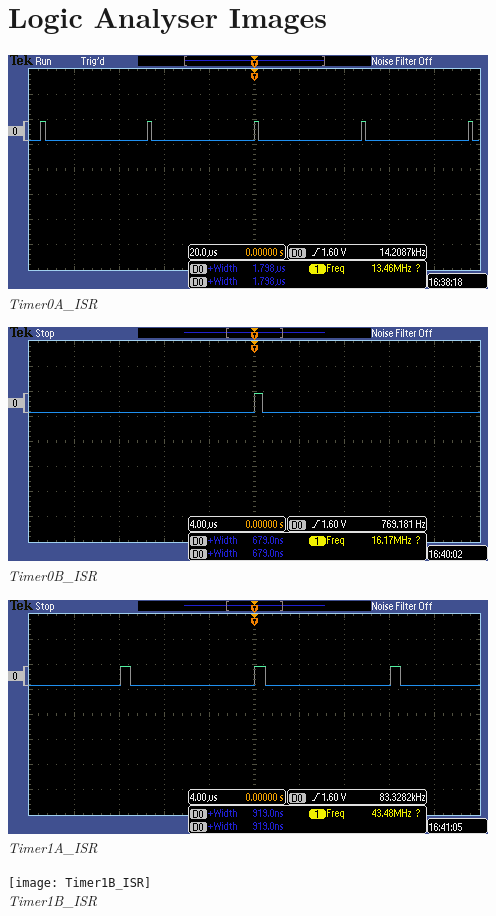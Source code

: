 \documentclass[twoside]{article}
\begin{document}
\section*{Logic Analyser Images}
\includegraphics[width=\textwidth]{Timer0A_ISR}\\
\emph{Timer0A\_ISR}\\
\vskip 0.1in

\includegraphics[width=\textwidth]{Timer0B_ISR}\\
\emph{Timer0B\_ISR}\\
\vskip 0.1in

\includegraphics[width=\textwidth]{Timer1A_ISR}\\
\emph{Timer1A\_ISR}\\
\vskip 0.1in

\texttt{[image: Timer1B\_ISR]}\\
\emph{Timer1B\_ISR}\\
\vskip 0.1in
\end{document}
